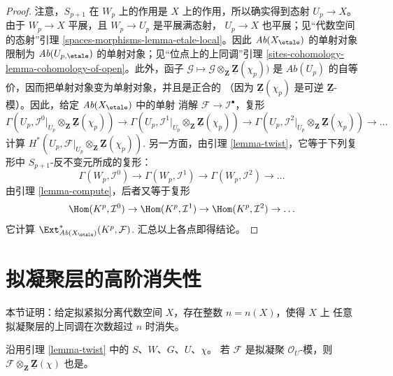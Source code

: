 \begin{proof}
注意，$S_{p + 1}$ 在 $W_p$ 上的作用是 $X$ 上的作用，所以确实得到态射
$U_p \to X$。由于 $W_p \to X$ 平展，且 $W_p \to U_p$ 是平展满态射，
$U_p \to X$ 也平展；见“代数空间的态射”引理
\ref{spaces-morphisms-lemma-etale-local}。因此
$\textit{Ab}(X_\etale)$ 的单射对象限制为
$\textit{Ab}(U_{p, \etale})$ 的单射对象；见“位点上的上同调”引理
\ref{sites-cohomology-lemma-cohomology-of-open}。此外，函子
$\mathcal{G} \mapsto
\mathcal{G} \otimes_\mathbf{Z} \underline{\mathbf{Z}}(\chi_p))$
是 $\textit{Ab}(U_p)$ 的自等价，因而把单射对象变为单射对象，并且是正合的
（因为 $\underline{\mathbf{Z}}(\chi_p)$ 是可逆
$\underline{\mathbf{Z}}$-模）。因此，给定 $\textit{Ab}(X_\etale)$ 中的单射
消解 $\mathcal{F} \to \mathcal{I}^\bullet$，复形
$$
\Gamma(U_p,
\mathcal{I}^0|_{U_p} \otimes_\mathbf{Z} \underline{\mathbf{Z}}(\chi_p))
\to
\Gamma(U_p,
\mathcal{I}^1|_{U_p} \otimes_\mathbf{Z} \underline{\mathbf{Z}}(\chi_p))
\to
\Gamma(U_p,
\mathcal{I}^2|_{U_p} \otimes_\mathbf{Z} \underline{\mathbf{Z}}(\chi_p))
\to \ldots
$$
计算
$H^*(U_p,
\mathcal{F}|_{U_p} \otimes_\mathbf{Z} \underline{\mathbf{Z}}(\chi_p))$.
另一方面，由引理 \ref{lemma-twist}，它等于下列复形中
$S_{p + 1}$-反不变元所成的复形：
$$
\Gamma(W_p, \mathcal{I}^0) \to
\Gamma(W_p, \mathcal{I}^1) \to
\Gamma(W_p, \mathcal{I}^2) \to \ldots
$$
由引理 \ref{lemma-compute}，后者又等于复形
$$
\Hom(K^p, \mathcal{I}^0) \to
\Hom(K^p, \mathcal{I}^1) \to
\Hom(K^p, \mathcal{I}^2) \to \ldots
$$
它计算
$\Ext^*_{\textit{Ab}(X_\etale)}(K^p, \mathcal{F})$.
汇总以上各点即得结论。
\end{proof}





\section{拟凝聚层的高阶消失性}
\label{section-higher-vanishing}

\noindent
本节证明：给定拟紧拟分离代数空间 $X$，存在整数 $n = n(X)$，使得 $X$ 上
任意拟凝聚层的上同调在次数超过 $n$ 时消失。

\begin{lemma}
\label{lemma-quasi-coherent-twist}
沿用引理 \ref{lemma-twist} 中的 $S$、$W$、$G$、$U$、$\chi$。
若 $\mathcal{F}$ 是拟凝聚 $\mathcal{O}_U$-模，则
$\mathcal{F} \otimes_{\mathbf{Z}} \underline{\mathbf{Z}}(\chi)$ 也是。
\end{lemma}

